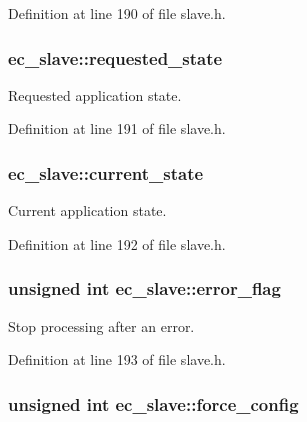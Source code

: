 Definition at line 190 of file slave.\-h.

\subsubsection[{requested\-\_\-state}]{ ec\-\_\-slave\-::requested\-\_\-state}\label{structec__slave_af81c1abd2ac2b8a5a5bfbbfe7d79ce70}


Requested application state. 



Definition at line 191 of file slave.\-h.

\subsubsection[{current\-\_\-state}]{ ec\-\_\-slave\-::current\-\_\-state}\label{structec__slave_a6214f41ec1dce05b67b298b89a49e1f8}


Current application state. 



Definition at line 192 of file slave.\-h.

\subsubsection[{error\-\_\-flag}]{\setlength{\rightskip}{0pt plus 5cm}unsigned int ec\-\_\-slave\-::error\-\_\-flag}\label{structec__slave_aef33c89d3974546f5aed153b379d0d24}


Stop processing after an error. 



Definition at line 193 of file slave.\-h.

\subsubsection[{force\-\_\-config}]{\setlength{\rightskip}{0pt plus 5cm}unsigned int ec\-\_\-slave\-::force\-\_\-config}\label{structec__slave_a0baba2f1593708191871119e3570655f}


